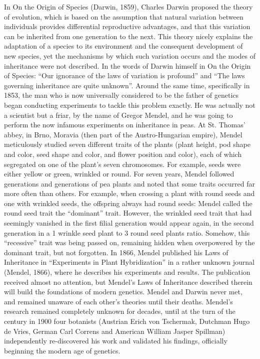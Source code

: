 In On the Origin of Species (Darwin, 1859), Charles Darwin proposed the theory of evolution, which is based on the assumption that natural variation between individuals provides differential reproductive advantages, and that this variation can be inherited from one generation to the next. 
This theory nicely explains the adaptation of a species to its environment and the consequent development of new species, yet the mechanisms by which such variation occurs and the modes of inheritance were not described. 
In the words of Darwin himself in On the Origin of Species: “Our ignorance of the laws of variation is profound” and “The laws governing inheritance are quite unknown”.
\vspace{4mm}
Around the same time, specifically in 1853, the man who is now universally considered to be the father of genetics began conducting experiments to tackle this problem exactly. 
He was actually not a scientist but a friar, by the name of Gregor Mendel, and he was going to perform the now infamous experiments on inheritance in peas. 
At St. Thomas’ abbey, in Brno, Moravia (then part of the Austro-Hungarian empire), Mendel meticulously studied seven different traits of the plants (plant height, pod shape and color, seed shape and color, and flower position and color), each of which segregated on one of the plant's seven chromosomes. 
For example, seeds were either yellow or green, wrinkled or round. For seven years, Mendel followed generations and generations of pea plants and noted that some traits occurred far more often than others. 
For example, when crossing a plant with round seeds and one with wrinkled seeds, the offspring always had round seeds: Mendel called the round seed trait the “dominant” trait. 
However, the wrinkled seed trait that had seemingly vanished in the first filial generation would appear again, in the second generation in a 1 wrinkle seed plant to 3  round seed plants ratio. 
Somehow, this “recessive” trait was being passed on, remaining hidden when overpowered by the dominant trait, but not forgotten. 
In 1866, Mendel published his Laws of Inheritance in “Experiments in Plant Hybridization” in a rather unknown journal (Mendel, 1866), where he describes his experiments and results. 
The publication received almost no attention, but Mendel's Laws of Inheritance described therein will build the foundations of modern genetics.
\vspace{4mm}
Mendel and Darwin never met, and remained unaware of each other’s theories until their deaths. 
Mendel’s research remained completely unknown for decades, until at the turn of the century in 1900 four botanists (Austrian Erich von Tschermak, Dutchman Hugo de Vries, German Carl Correns and American William Jasper Spillman) independently re-discovered his work and validated his findings, officially beginning the modern age of genetics. 
